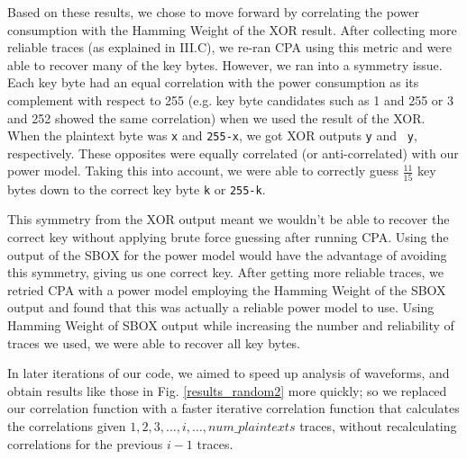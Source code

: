 \documentclass[journal]{ieee_style}
\begin{document}
Based on these results, we chose to move forward by correlating the power consumption with the Hamming Weight of the XOR result. After collecting more reliable traces (as explained in III.C), we re-ran CPA using this metric and were able to recover many of the key bytes. However, we ran into a symmetry issue. Each key byte had an equal correlation with the power consumption as its complement with respect to 255 (e.g. key byte candidates such as 1 and 255 or 3 and 252 showed the same correlation) when we used the result of the XOR. When the plaintext byte was \texttt{x} and \texttt{255-x}, we got XOR outputs \texttt{y} and  \texttt{~y}, respectively. These opposites were equally correlated (or anti-correlated) with our power model. Taking this into account, we were able to correctly guess $\frac{11}{15}$ key bytes down to the correct key byte \texttt{k} or \texttt{255-k}. 

This symmetry from the XOR output meant we wouldn't be able to recover the correct key without applying brute force guessing after running CPA. Using the output of the SBOX for the power model would have the advantage of avoiding this symmetry, giving us one correct key. After getting more reliable traces, we retried CPA with a power model employing the Hamming Weight of the SBOX output and found that this was actually a reliable power model to use. Using Hamming Weight of SBOX output while increasing the number and reliability of traces we used, we were able to recover all key bytes.

 In later iterations of our code, we aimed to speed up analysis of waveforms, and obtain results like those in Fig. \ref{results_random2} more quickly; so we replaced our correlation function with a faster iterative correlation function that calculates the correlations given $1,2,3,\ldots, i, \ldots, num\_plaintexts$ traces, without recalculating correlations for the previous $i-1$ traces.
\end{document}
